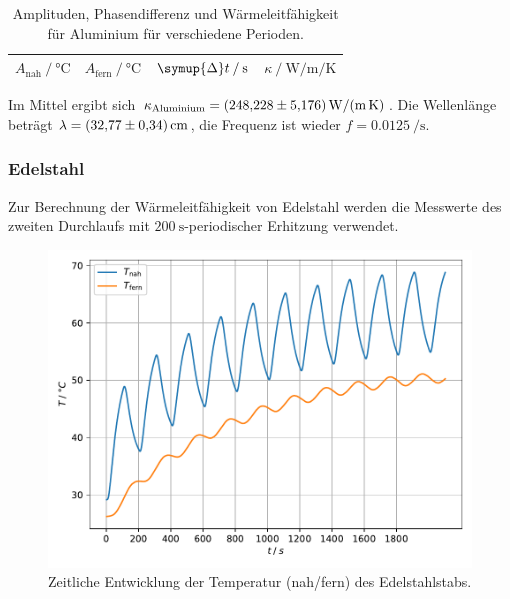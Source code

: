 \begin{table}[H]
     \centering
     \caption{Amplituden, Phasendifferenz und Wärmeleitfähigkeit für Aluminium für verschiedene Perioden.}
     \label{tab:aluminium}
     \begin{tabular}{c c c c}
      \toprule
      $A_\text{nah} \mathbin{/} \si{\celsius}$ &
      $A_\text{fern} \mathbin{/} \si{\celsius}$ &
      $\symup{\Delta}t \mathbin{/} \si{\second}$ &
      $\kappa \mathbin{/} \si{\watt\per\meter\per\kelvin}$ \\
      \midrule
      
      \bottomrule
     \end{tabular}
\end{table}

Im Mittel ergibt sich $\kappa_\text{Aluminium} = \SI{248.228 \pm 5.176}{\watt\per\meter\per\kelvin}$.
Die Wellenlänge beträgt $\lambda = \SI{32.77 \pm 0.34}{\centi\meter}$,
die Frequenz ist wieder $f = \SI{0.0125}{\per\second}$.


\subsubsection{Edelstahl}

Zur Berechnung der Wärmeleitfähigkeit von Edelstahl werden die Messwerte des zweiten Durchlaufs mit
$\SI{200}{\second}$-periodischer Erhitzung verwendet.

\begin{figure}[H]
  \centering
  \includegraphics{build/plot_dynamisch_edelstahl.pdf}
  \caption{Zeitliche Entwicklung der Temperatur (nah/fern) des Edelstahlstabs.}
  \label{fig:dynamisch_edelstahl}
\end{figure}

